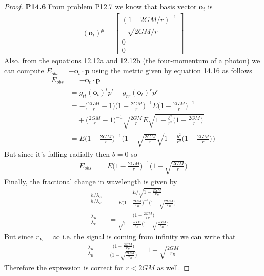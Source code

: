 \documentclass[11pt]{article}
\theoremstyle{definition}
\begin{document}
\cleardoublepage
\begin{proof}{\textbf{P14.6}}
From problem P12.7 we know that basis vector $\bm{o}_t$ is
\begin{align*}
    (\bm{o}_t)^\mu = \begin{bmatrix}
        (1- 2GM/r)^{-1}\\[7pt] -\sqrt{2GM/r}\\[7pt] 0\\[7pt] 0
    \end{bmatrix}
\end{align*}
Also, from the equations 12.12a and 12.12b (the four-momentum
of a photon) we can compute $E_{obs} = - \bm{o}_t \cdot \bm{p}$ using the
metric given by equation 14.16 as follows
\begin{align*}
    E_{obs} &= - \bm{o}_t \cdot \bm{p}\\
    &= g_{tt}(\bm{o}_t)^tp^t - g_{rr}(\bm{o}_t)^rp^r\\
    &= -\bigg(\frac{2GM}{r} - 1\bigg)\bigg(1 - \frac{2GM}{r}\bigg)^{-1}
    E\bigg(1 - \frac{2GM}{r}\bigg)^{-1}\\
    &\quad+ \bigg(\frac{2GM}{r} - 1\bigg)^{-1}
    \sqrt{\frac{2GM}{r}}E\sqrt{1 - \frac{b^2}{r^2}\bigg(1 - \frac{2GM}{r}\bigg)}\\
    &= E\bigg(1 - \frac{2GM}{r}\bigg)^{-1}
    \bigg(1 - \sqrt{\frac{2GM}{r}}
    \sqrt{1 - \frac{b^2}{r^2}\bigg(1 - \frac{2GM}{r}\bigg)}\bigg)
\end{align*}
But since it's falling radially then $b = 0$ so
\begin{align*}
    E_{obs} &= E\bigg(1 - \frac{2GM}{r}\bigg)^{-1}
    \bigg(1 - \sqrt{\frac{2GM}{r}}\bigg)
\end{align*}
Finally, the fractional change in wavelength is given by
\begin{align*}
    \frac{h/\lambda_E}{h/\lambda_R}
    &= \frac{E/\sqrt{1 - \frac{2GM}{r_E}}}
    {E\bigg(1 - \frac{2GM}{r_R}\bigg)^{-1}
    \bigg(1 - \sqrt{\frac{2GM}{r_R}}\bigg)}\\
    \frac{\lambda_R}{\lambda_E}
    &= \frac{\bigg(1 - \frac{2GM}{r_R}\bigg)}
    {\sqrt{1 - \frac{2GM}{r_E}}
    \bigg(1 - \sqrt{\frac{2GM}{r_R}}\bigg)}
\end{align*}
But since $r_E = \infty$ i.e. the signal is coming from infinity
we can write that
\begin{align*}
    \frac{\lambda_R}{\lambda_E}
    &= \frac{\bigg(1 - \frac{2GM}{r_R}\bigg)}
    {\bigg(1 - \sqrt{\frac{2GM}{r_R}}\bigg)}
    = 1 + \sqrt{\frac{2GM}{r_R}}
\end{align*}
Therefore the expression is correct for $r < 2GM$ as well.
\end{proof}
\end{document}
